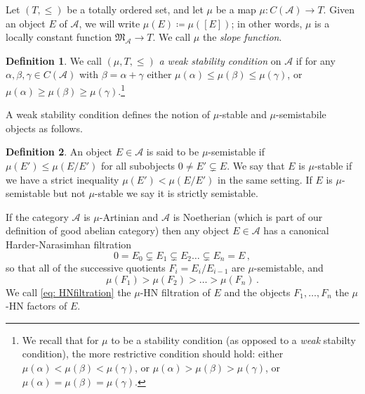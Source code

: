 \documentclass[12pt]{amsart}
\theoremstyle{definition}
\newtheorem{definition}{Definition}[section]
\newcommand{\CA}{{\mathcal A}}
\newcommand{\1}{\mathbf 1}
\newcommand{\FM}{{\mathfrak{M}}}
\begin{document}


Let $(T, \leq)$ be a totally  ordered set, and let $\mu$ be a map $\mu: C(\mathcal A) \to T$. Given an object $E$ of $\CA$, we will write $\mu(E)\coloneqq \mu([E])$; in other words, $\mu$ is a locally constant function $\FM_\CA\to T$. We call $\mu$ the \emph{slope function}.

\begin{definition}\label{def: stabcondition} We call $(\mu, T, \leq)$ \textit{a weak stability condition} on $\mathcal A$ if for any $\alpha, \beta, \gamma\in C(\CA)$ with $\beta = \alpha + \gamma$ either $\mu(\alpha) \leq \mu(\beta) \leq \mu(\gamma)$, or $\mu(\alpha) \geq \mu(\beta) \geq \mu(\gamma)$.\footnote{We recall that for $\mu$ to be a stability condition (as opposed to a \textit{weak} stabilty condition), the more restrictive condition should hold: either $\mu(\alpha) < \mu(\beta) < \mu(\gamma)$, or $\mu(\alpha) > \mu(\beta) > \mu(\gamma)$, or $\mu(\alpha) = \mu(\beta) = \mu(\gamma)$.} \end{definition}

A weak stability condition defines the notion of $\mu$-stable and $\mu$-semistabile objects as follows.

\begin{definition}\label{def: stableobject} An object $E \in \mathcal A$ is said to be $\mu$-semistable if $\mu(E') \leq \mu(E/E')$ for all subobjects $0\neq E' \subsetneq E$. We say that $E$ is $\mu$-stable if we have a strict inequality $\mu(E') <\mu(E/E')$ in the same setting. If $E$ is $\mu$-semistable but not $\mu$-stable we say it is strictly semistable.
\end{definition}

If the category $\CA$ is $\mu$-Artinian and $\CA$ is Noetherian (which is part of our definition of good abelian category) then any object $E\in \CA$ has a canonical Harder-Narasimhan filtration
\begin{equation}\label{eq: HNfiltration}
0 = E_0 \subsetneq E_1 \subsetneq E_2 \ldots \subsetneq E_n = E\,,\end{equation}
so that all of the successive quotients $F_i=E_i/E_{i-1}$ are $\mu$-semistable, and 
\[\mu(F_1) > \mu(F_2)> \ldots > \mu(F_n)\,.\]
We call \eqref{eq: HNfiltration} the $\mu$-HN filtration of $E$ and the objects $F_1, \ldots, F_n$ the $\mu$-HN factors of $E$. 
\end{document}
